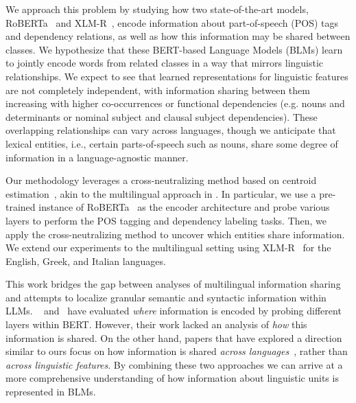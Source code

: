 \documentclass[11pt,a4paper]{article}
\begin{document}
We approach this problem by studying how two state-of-the-art models, RoBERTa~\citep{liu_roberta_2019} and XLM-R~\citep{conneau_unsupervised_2020}, encode information about part-of-speech (POS) tags and dependency relations, as well as how this information may be shared between classes. We hypothesize that these BERT-based Language Models (BLMs) learn to jointly encode words from related classes in a way that mirrors linguistic relationships. We expect to see that learned representations for linguistic features are not completely independent, with information sharing between them increasing with higher co-occurrences or functional dependencies (e.g. nouns and determinants or nominal subject and clausal subject dependencies). These overlapping relationships can vary across languages, though we anticipate that lexical entities, i.e., certain parts-of-speech such as nouns, share some degree of information in a language-agnostic manner.

Our methodology leverages a cross-neutralizing method based on centroid estimation~\citep{libovicky_language_2020}, akin to the multilingual approach in \citet{choenni_investigating_2022}. In particular, we use a pre-trained instance of RoBERTa~\citep{liu_roberta_2019} as the encoder architecture and probe various layers to perform the POS tagging and dependency labeling tasks. Then, we apply the cross-neutralizing method to uncover which entities share information. We extend our experiments to the multilingual setting using XLM-R~\citep{conneau_unsupervised_2020} for the English, Greek, and Italian languages.

This work bridges the gap between analyses of multilingual information sharing and attempts to localize granular semantic and syntactic information within LLMs. ~\citet{tenney_bert_2019} and~\citet{clark_what_2019} have evaluated \textit{where} information is encoded by probing different layers within BERT. However, their work lacked an analysis of \textit{how} this information is shared. On the other hand, papers that have explored a direction similar to ours focus on how information is shared \textit{across languages}~\citep{choenni_investigating_2022}, rather than \textit{across linguistic features}. By combining these two approaches we can arrive at a more comprehensive understanding of how information about linguistic units is represented in BLMs. 
\end{document}
